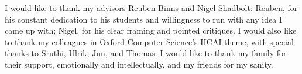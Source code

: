 I would like to thank my advisors Reuben Binns and Nigel Shadbolt: Reuben, for his constant dedication to his students and willingness to run with any idea I came up with; Nigel, for his clear framing and pointed critiques. I would also like to thank my colleagues in Oxford Computer Science's HCAI theme, with special thanks to Sruthi, Ulrik, Jun, and Thomas. I would like to thank my family for their support, emotionally and intellectually, and my friends for my sanity.
